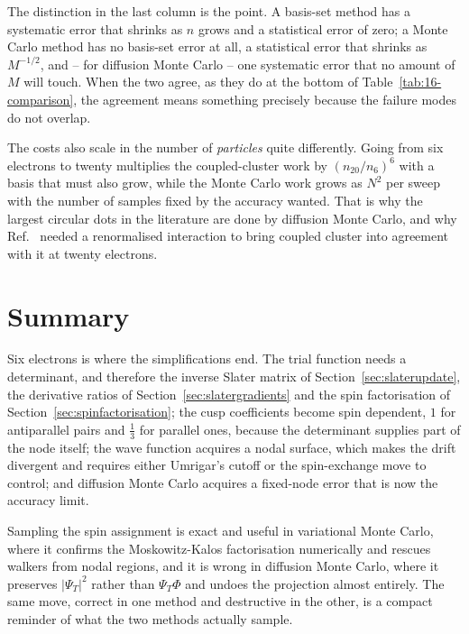 The distinction in the last column is the point.  A basis-set method has a
systematic error that shrinks as $n$ grows and a statistical error of zero; a
Monte Carlo method has no basis-set error at all, a statistical error that
shrinks as $M^{-1/2}$, and -- for diffusion Monte Carlo -- one systematic error
that no amount of $M$ will touch.  When the two agree, as they do at the bottom
of Table~\ref{tab:16-comparison}, the agreement means something precisely
because the failure modes do not overlap.

The costs also scale in the number of \emph{particles} quite differently.
Going from six electrons to twenty multiplies the coupled-cluster work by
$(n_{20}/n_6)^6$ with a basis that must also grow, while the Monte Carlo work
grows as $N^2$ per sweep with the number of samples fixed by the accuracy
wanted.  That is why the largest circular dots in the literature are done by
diffusion Monte Carlo, and why Ref.~\cite{lohne2011} needed a renormalised
interaction to bring coupled cluster into agreement with it at twenty
electrons.

\section{Summary}
\label{sec:appsummary}

Six electrons is where the simplifications end.  The trial function needs a
determinant, and therefore the inverse Slater matrix of
Section~\ref{sec:slaterupdate}, the derivative ratios of
Section~\ref{sec:slatergradients} and the spin factorisation of
Section~\ref{sec:spinfactorisation}; the cusp coefficients become spin
dependent, $1$ for antiparallel pairs and $\tfrac13$ for parallel ones, because
the determinant supplies part of the node itself; the wave function acquires a
nodal surface, which makes the drift divergent and requires either Umrigar's
cutoff or the spin-exchange move to control; and diffusion Monte Carlo acquires
a fixed-node error that is now the accuracy limit.

Sampling the spin assignment is exact and useful in variational Monte Carlo,
where it confirms the Moskowitz-Kalos factorisation numerically and rescues
walkers from nodal regions, and it is wrong in diffusion Monte Carlo, where it
preserves $|\Psi_T|^2$ rather than $\Psi_T\Phi$ and undoes the projection
almost entirely.  The same move, correct in one method and destructive in the
other, is a compact reminder of what the two methods actually sample.

